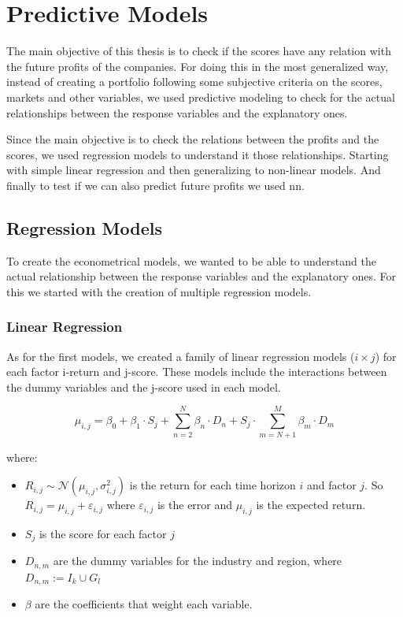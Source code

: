 \documentclass[11pt,english,a4paper,hidelinks]{book}
\begin{document}
\section{Predictive Models}
The main objective of this thesis is to check if the scores have any relation with the future profits of the companies. For doing this in the most generalized way, instead of creating a portfolio following some subjective criteria on the scores, markets and other variables, we used predictive modeling to check for the actual relationships between the response variables and the explanatory ones.

\vspace{0.5cm}
\noindent Since the main objective is to check the relations between the profits and the scores, we used regression models to understand it those relationships. Starting with simple linear regression and then generalizing to non-linear models. And finally to test if we can also predict future profits we used \gls{nn}.


\subsection{Regression Models}

To create the econometrical models, we wanted to be able to understand the actual relationship between the response variables and the explanatory ones. For this we started with the creation of multiple regression models.

\subsubsection{Linear Regression}

As for the first models, we created a family of linear regression models (\(i \times j\)) for each factor i-return and j-score. These models include the interactions between the dummy variables and the j-score used in each model.

\begin{equation}
    \mu_{i,j} = \beta_0+\beta_1 \cdot S_j + 
\sum_{n=2}^{N}\beta_{n}\cdot D_n + S_j \cdot \sum_{m=N+1}^{M}\beta_{m}\cdot D_m
\end{equation}

\noindent where:
\begin{itemize}
    \item  \(R_{i,j} \sim \mathcal{N}(\mu_{i,j}, \sigma_{i,j}^2)\) is the return for each time horizon \(i\) and factor \(j\). So \(R_{i,j} = \mu_{i,j} + \varepsilon_{i,j}\) where \(\varepsilon_{i,j}\) is the error and \(\mu_{i,j}\) is the expected return.
    \item \(S_j\) is the score for each factor \(j\)
    \item \(D_{n,m}\) are the dummy variables for the industry and region, where \(D_{n,m} := I_k \cup G_l\)
    \item \(\beta\) are the coefficients that weight each variable.
\end{itemize}
\end{document}
